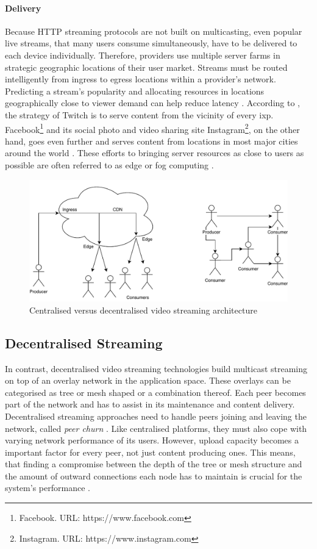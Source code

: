 \paragraph{Delivery}
Because HTTP streaming protocols are not built on multicasting, even popular live streams, that many users consume simultaneously, have to be delivered to each device individually. Therefore, providers use multiple server farms \cite[p. 738-740]{tanenbaum_wetherall_2011} in strategic geographic locations of their user market. Streams must be routed intelligently from ingress to egress locations within a provider's network. Predicting a stream's popularity and allocating resources in locations geographically close to viewer demand can help reduce latency \cite{twitch-case}. According to \citet[\S3]{twitch-case}, the strategy of Twitch is to serve content from the vicinity of every \gls{ixp}. Facebook\footnote{Facebook. URL: {https://www.facebook.com}} and its social photo and video sharing site Instagram\footnote{Instagram. URL: {https://www.instagram.com}}, on the other hand, goes even further and serves content from locations in most major cities around the world \cite{facebook-locations}. These efforts to bringing server resources as close to users as possible are often referred to as edge or fog computing \cite{fog-computing, object-store-fog-edge-ipfs}.

\begin{figure}
\centering
\includegraphics[width=.5\textwidth]{graphics/streaming-types.pdf}
\caption{Centralised versus decentralised video streaming architecture}
\label{fig:de-central-architectures}
\end{figure}

\subsection{Decentralised Streaming}

In contrast, decentralised video streaming technologies build multicast streaming on top of an overlay network in the application space. These overlays can be categorised as tree or mesh shaped or a combination thereof. Each peer becomes part of the network and has to assist in its maintenance and content delivery. Decentralised streaming approaches need to handle peers joining and leaving the network, called \textit{peer churn} \cite[\S7.5]{tanenbaum_wetherall_2011}. Like centralised platforms, they must also cope with varying network performance of its users. However, upload capacity becomes a important factor for every peer, not just content producing ones. This means, that finding a compromise between the depth of the tree or mesh structure and the amount of outward connections each node has to maintain is crucial for the system's performance \cite[\S{III.A}]{multicast-problems}.

